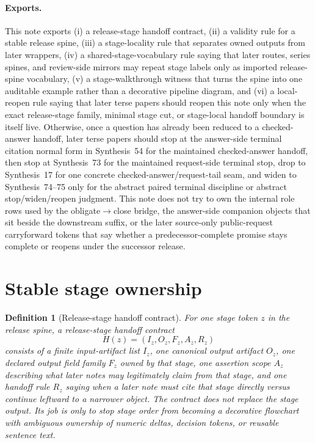 \documentclass[11pt]{article}
\newtheorem{definition}{Definition}
\begin{document}
\paragraph{Exports.}
This note exports (i) a release-stage handoff contract, (ii) a validity rule for a stable release spine, (iii) a stage-locality rule that separates owned outputs from later wrappers, (iv) a shared-stage-vocabulary rule saying that later routes, series spines, and review-side mirrors may repeat stage labels only as imported release-spine vocabulary, (v) a stage-walkthrough witness that turns the spine into one auditable example rather than a decorative pipeline diagram, and (vi) a local-reopen rule saying that later terse papers should reopen this note only when the exact release-stage family, minimal stage cut, or stage-local handoff boundary is itself live. Otherwise, once a question has already been reduced to a checked-answer handoff, later terse papers should stop at the answer-side terminal citation normal form in Synthesis~54 for the maintained checked-answer handoff, then stop at Synthesis~73 for the maintained request-side terminal stop, drop to Synthesis~17 for one concrete checked-answer/request-tail seam, and widen to Synthesis~74--75 only for the abstract paired terminal discipline or abstract stop/widen/reopen judgment. This note does not try to own the internal role rows used by the obligate$\to$close bridge, the answer-side companion objects that sit beside the downstream suffix, or the later source-only public-request carryforward tokens that say whether a predecessor-complete promise stays complete or reopens under the successor release.\cite{series:challengeanswerreviewmenus,series:pairedterminalcitationdiscipline,series:pairedterminalcutoverrules,series:workedexample}

\section{Stable stage ownership}

\begin{definition}[Release-stage handoff contract]
For one stage token $z$ in the release spine, a \emph{release-stage handoff contract}
\[
H(z)=(I_z,O_z,F_z,A_z,R_z)
\]
consists of a finite input-artifact list $I_z$, one canonical output artifact $O_z$, one declared output field family $F_z$ owned by that stage, one assertion scope $A_z$ describing what later notes may legitimately claim from that stage, and one handoff rule $R_z$ saying when a later note must cite that stage directly versus continue leftward to a narrower object.
The contract does not replace the stage output.
Its job is only to stop stage order from becoming a decorative flowchart with ambiguous ownership of numeric deltas, decision tokens, or reusable sentence text.
\end{definition}
\end{document}
